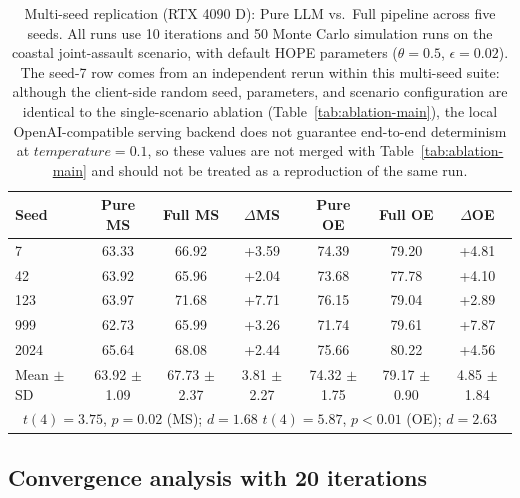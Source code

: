 \begin{table}[ht]
\centering
\caption{Multi-seed replication (RTX 4090 D): Pure LLM vs.\ Full pipeline across five seeds. All runs use 10 iterations and 50 Monte Carlo simulation runs on the coastal joint-assault scenario, with default HOPE parameters ($\theta=0.5$, $\epsilon=0.02$). The seed-7 row comes from an independent rerun within this multi-seed suite: although the client-side random seed, parameters, and scenario configuration are identical to the single-scenario ablation (Table~\ref{tab:ablation-main}), the local OpenAI-compatible serving backend does not guarantee end-to-end determinism at $temperature=0.1$, so these values are not merged with Table~\ref{tab:ablation-main} and should not be treated as a reproduction of the same run.}
\label{tab:multiseed}
\footnotesize
\setlength{\tabcolsep}{2.8pt}
\begin{tabular}{lcccccc}
\toprule
Seed & Pure MS & Full MS & $\Delta$MS & Pure OE & Full OE & $\Delta$OE \\
\midrule
7 & 63.33 & 66.92 & +3.59 & 74.39 & 79.20 & +4.81 \\
42 & 63.92 & 65.96 & +2.04 & 73.68 & 77.78 & +4.10 \\
123 & 63.97 & 71.68 & +7.71 & 76.15 & 79.04 & +2.89 \\
999 & 62.73 & 65.99 & +3.26 & 71.74 & 79.61 & +7.87 \\
2024 & 65.64 & 68.08 & +2.44 & 75.66 & 80.22 & +4.56 \\
\midrule
Mean $\pm$ SD & \shortstack{63.92\\$\pm$1.09} & \shortstack{67.73\\$\pm$2.37} & \shortstack{3.81\\$\pm$2.27} & \shortstack{74.32\\$\pm$1.75} & \shortstack{79.17\\$\pm$0.90} & \shortstack{4.85\\$\pm$1.84} \\
\midrule
\multicolumn{7}{c}{\footnotesize $t(4)=3.75$, $p=0.02$ (MS); $d=1.68$ \hspace{1em} $t(4)=5.87$, $p<0.01$ (OE); $d=2.63$} \\
\bottomrule
\end{tabular}
\end{table}

\subsection{Convergence analysis with 20 iterations}

